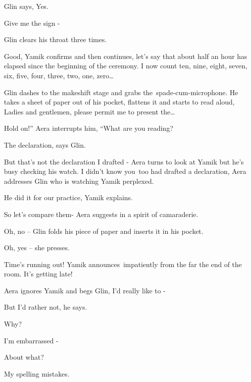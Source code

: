 \documentclass[letterpaper]{article}
\begin{document}
Glin says, {\textquotedbl}Yes.{\textquotedbl} 

{\textquotedbl}Give me the sign -{\textquotedbl}

Glin clears his throat three times. 

{\textquotedbl}Good,{\textquotedbl} Yamik confirms and then continues, {\textquotedbl}let's say that about half an hour
has elapsed since the beginning of the ceremony. I now count ten, nine, eight, seven, six, five, four, three, two, one,
zero{\dots}{\textquotedbl} 

Glin dashes to the makeshift stage and grabs the\textcolor{red}{\ }spade-cum-microphone. He takes a sheet of paper out
of his pocket, flattens it and starts to read aloud, {\textquotedbl}Ladies and gentlemen, please permit me to present
the{\dots} {\textquotedbl} 

{\textquotedbl}Hold on!'' Aera interrupts him, ``What are you reading?{\textquotedbl} 

{\textquotedbl}The declaration,{\textquotedbl} says Glin. 

{\textquotedbl}But that's not the declaration I drafted -{\textquotedbl} Aera turns to look at Yamik but he's busy
checking his watch. {\textquotedbl}I didn't know you\ too had drafted a declaration,{\textquotedbl} Aera addresses Glin
who is watching Yamik perplexed.

{\textquotedbl}He did it for our practice,{\textquotedbl} Yamik explains. 

{\textquotedbl}So let's compare them-{\textquotedbl} Aera suggests in a spirit of camaraderie.

{\textquotedbl}Oh, no --{\textquotedbl} Glin folds his piece of paper and inserts it in his pocket.\ 

{\textquotedbl}Oh, yes --{\textquotedbl} she presses.

{\textquotedbl}Time's running out!{\textquotedbl} Yamik announces~impatiently from the far the end of the room.
{\textquotedbl}It's getting late!{\textquotedbl}

Aera ignores Yamik and begs Glin, {\textquotedbl}I'd really like to -{\textquotedbl} 

{\textquotedbl}But I'd rather not,{\textquotedbl} he says. 

{\textquotedbl}Why?{\textquotedbl} 

{\textquotedbl}I'm embarrassed -{\textquotedbl} 

{\textquotedbl}About what?{\textquotedbl}~ 

{\textquotedbl}My spelling mistakes.{\textquotedbl} 
\end{document}
